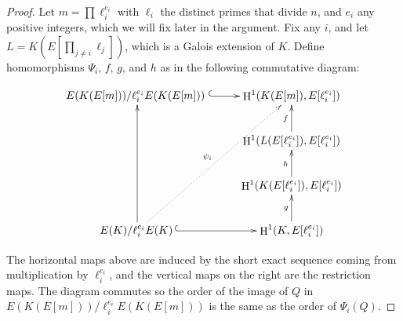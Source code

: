 \documentclass{oupau}
\DeclareMathOperator{\HH}{H}
\renewcommand{\H}{\HH}
\begin{document}
\begin{proof}
 Let $m = \prod \ell_i^{e_i}$ with $\ell_i$
  the distinct primes that divide $n$, and $e_i$ any positive integers,
which we will fix later in the argument.  Fix any $i$, and let $L =
  K(E[\prod_{j\neq i}\ell_j])$, which is a Galois extension of $K$.
  Define homomorphisms $\Psi_i$, $f$, $g$, and $h$ as in the following
  commutative diagram:

$$
\xymatrix{
   E(K(E[m]))/\ell_i^{e_i} E(K(E[m]))\,\,\ar@{^(->}[r] &   \H^1(K(E[m]),E[\ell_i^{e_i}]) \\
        &  \H^1(L(E[\ell_i^{e_i}]),E[\ell_i^{e_i}])\ar[u]^f\\
        &  \H^1(K(E[\ell_i^{e_i}]),E[\ell_i^{e_i}])\ar[u]^h\\
     E(K)/\ell_i^{e_i} E(K)\ar[uuu]\ar@{.>}[uuur]^{\psi_i}\,\ar@{^(->}[r]    &   \H^1(K, E[\ell_i^{e_i}])\ar[u]^g
}
$$


The horizontal maps above are induced by the short exact sequence
coming from multiplication by $\ell_i^{e_i}$, and the vertical maps on
the right are the restriction maps.  The diagram commutes so
the order of the image of $Q$ in $E(K(E[m]))/\ell_i^{e_i} E(K(E[m]))$
is the same as the order of $\Psi_i(Q)$.


\end{proof}
\end{document}
